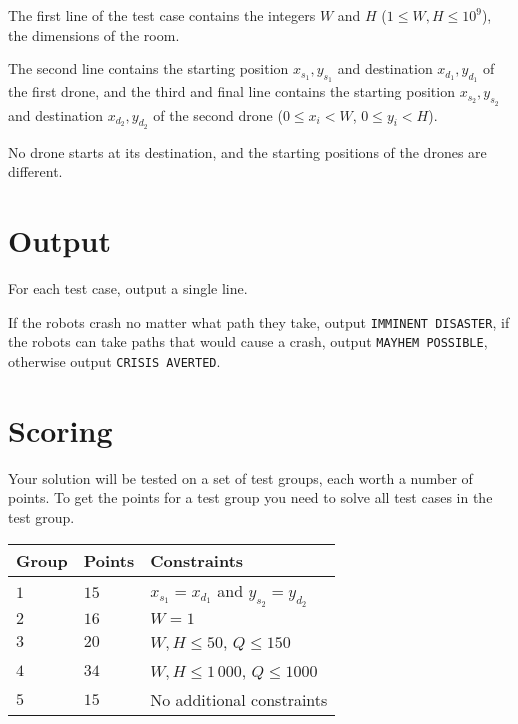 The first line of the test case contains the integers $W$ and $H$ ($1 \le W, H \le 10^9$), the dimensions of the room.

The second line contains the starting position $x_{s_1}, y_{s_1}$ and destination $x_{d_1}, y_{d_1}$ of the first drone,
and the third and final line contains the starting position $x_{s_2}, y_{s_2}$ and destination $x_{d_2}, y_{d_2}$ of the second drone ($0 \le x_i < W$, $0 \le y_i < H$).

No drone starts at its destination, and the starting positions of the drones are different.

\section*{Output}
For each test case, output a single line.

If the robots crash no matter what path they take, output \texttt{IMMINENT DISASTER},
if the robots can take paths that would cause a crash, output \texttt{MAYHEM POSSIBLE},
otherwise output \texttt{CRISIS AVERTED}.

\section*{Scoring}
Your solution will be tested on a set of test groups, each worth a number of points.
To get the points for a test group you need to solve all test cases in the test group.

\noindent
\begin{tabular}{| l | l | l |}
  \hline
  Group & Points & Constraints \\ \hline
  $1$    & $15$         &  $x_{s_1} = x_{d_1}$ and $y_{s_2} = y_{d_2}$ \\ \hline
  $2$    & $16$        &  $W = 1$ \\ \hline
  $3$    & $20$        &  $W, H \le 50$, $Q \le 150$ \\ \hline
  $4$    & $34$        &  $W, H \le 1\,000$, $Q \le 1000$ \\ \hline
  $5$    & $15$        &  No additional constraints \\ \hline
\end{tabular}
